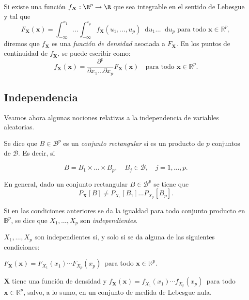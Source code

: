 \begin{ndef}
    Si existe una función $f_{\boldsymbol X} : \R^p \to \R$ que sea integrable en el sentido de Lebesgue y tal que
    \[
    F_{\boldsymbol X}(\boldsymbol x) = \int^{x_1}_{-\infty} \dots \int^{x_p}_{-\infty} f_{\boldsymbol X}(u_1, \dots,  u_p) \mathop{}\!\mathrm{d}u_1 \dots \mathop{}\!\mathrm{d}u_p \text{ para todo } \boldsymbol  x \in \mathbb{R}^p
    ,\]
    diremos que $f_{\boldsymbol X}$ es una \emph{función de densidad} asociada a  $F_{\boldsymbol X}$. En los puntos de continuidad de $f_{\boldsymbol X}$, se puede escribir como:
    \[
    f_{\boldsymbol X}(\boldsymbol x) = \frac{\partial^p}{\partial x_1 \dots \partial x_p} F_{\boldsymbol X}(\boldsymbol x) \quad \text{para todo } \boldsymbol x \in \mathbb{R}^p
    .\]
\end{ndef}

\subsection{Independencia}

Veamos ahora algunas nociones relativas a la independencia de variables aleatorias.

\begin{ndef}
  Se dice que $B\in \mathscr{B}^p$ es un \emph{conjunto rectangular} si es un producto de $p$ conjuntos de $\mathscr{B}$. Es decir, si
  
\[
    B = B_1 \times \dots \times B_p,\quad B_j \in \mathscr{B}, \quad j = 1, \dots, p
.\]
\end{ndef}

En general, dado un conjunto rectangular $B \in \mathscr{B}^p$ se tiene que
\[
P_{\boldsymbol X}[B] \neq P_{X_1}[B_1] \dots  P_{X_p}[B_p].
\]

\begin{ndef}
    Si en las condiciones anteriores se da la igualdad para todo conjunto producto en \(\mathbb{B}^p\), se dice que \(X_1, \dots, X_p\) son \emph{independientes}.
\end{ndef}

\begin{nprop}
  \(X_1, \dots, X_p\) son independientes si, y solo si se da alguna de las siguientes condiciones:
  \begin{nlist}
  \item $F_{\boldsymbol X} (\boldsymbol x) = F_{X_1} (x_1) \cdots F_{X_p}(x_p)\,$ para todo \(\boldsymbol x \in \mathbb{R}^p\).
   \item $\boldsymbol X$ tiene una función de densidad y \(f_{\boldsymbol X} (\boldsymbol x) = f_{X_1}(x_1) \cdots f_{X_p}(x_p)\,\) para todo \(\boldsymbol x \in \mathbb{R}^p\), salvo, a lo sumo, en un conjunto de medida de Lebesgue nula.
  \end{nlist}
\end{nprop}

